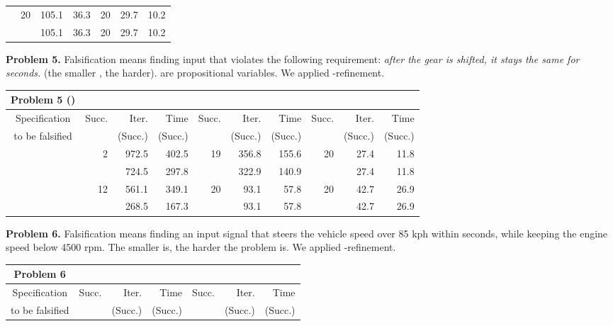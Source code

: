 \documentclass[envcountsect,orivec]{llncs} \usepackage{etex} \usepackage[]{graphicx}
\newcommand{\Succ}{Succ.}
\begin{document}
\begin{table}[ptb]
\begin{tabular}{c||r|r|r|r|r|r}
    & 20& 105.1&  36.3& 20& 29.7& 10.2\\
    &   & 105.1&  36.3& 20& 29.7& 10.2\\
  \end{tabular}

  \vspace{1em}
  \begin{minipage}{\textwidth}
    \textbf{Problem 5.} Falsification means finding input
    that violates the following requirement: \emph{after the gear is
      shifted, it stays the same for  seconds.}
(the smaller , the harder).
     are propositional variables.
    We applied -refinement.
  \end{minipage}
  \begin{tabular}{c||r|r|r|r|r|r|r|r|r}
    \textbf{Problem 5} ()
    &\multicolumn{3}{|c|}{} &\multicolumn{3}{|c|}{} &\multicolumn{3}{|c}{}\\ \hline
    Specification & \Succ & Iter. & Time & \Succ & Iter. & Time &
    \Succ & Iter. & Time \\
    to be falsified
    &  & (\Succ) & (\Succ) & & (\Succ) & (\Succ)&  & (\Succ) & (\Succ)\\  \hline\hline
    {\scriptsize }
    & 2& 972.5 & 402.5& 19& 356.8& 155.6& 20& 27.4& 11.8\\
    {\scriptsize }
    &  & 724.5 & 297.8&   & 322.9& 140.9&   & 27.4& 11.8\\ \hline
    {\scriptsize }
    & 12& 561.1& 349.1& 20& 93.1& 57.8& 20& 42.7& 26.9\\
    {\scriptsize }
    &   & 268.5& 167.3&   & 93.1& 57.8&   & 42.7& 26.9\\
  \end{tabular}

  \vspace{1em}
  \begin{minipage}{\textwidth}
    \textbf{Problem 6.} 
    Falsification means finding an input signal 
    that steers the vehicle speed  over 85 kph within  seconds,
    while keeping the engine speed  below 4500 rpm.
    The smaller  is, the harder the problem is.
We applied -refinement.
  \end{minipage}
  \begin{tabular}{c||r|r|r|r|r|r}
    \textbf{Problem 6}
    &\multicolumn{3}{|c|}{} &\multicolumn{3}{|c}{} \\ \hline
    Specification & \Succ & Iter. & Time & \Succ & Iter. & Time \\
    to be falsified
    &  & (\Succ) & (\Succ) & & (\Succ) & (\Succ)\\  \hline\hline
    

\end{tabular}
\end{table}
\end{document}
